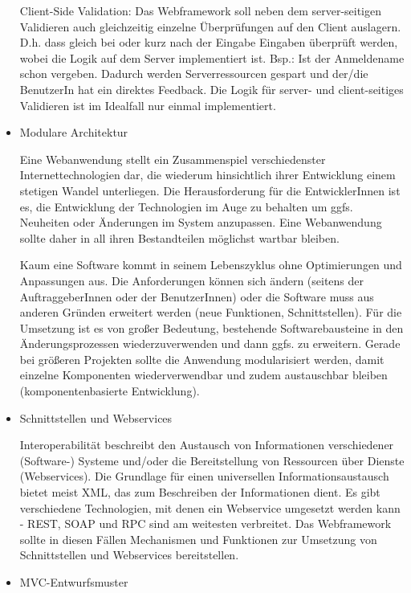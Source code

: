 \documentclass[abstracton, listof=totocnumbered,
bibliography=totocnumbered]{scrreprt}
\begin{document}
\begin{itemize}
Client-Side Validation: Das Webframework soll neben dem server-seitigen
Validieren auch gleichzeitig einzelne Überprüfungen auf den Client auslagern.
D.h. dass gleich bei oder kurz nach der Eingabe Eingaben überprüft werden,
wobei die Logik auf dem Server implementiert ist. Bsp.: Ist der Anmeldename
schon vergeben. Dadurch werden Serverressourcen gespart und der/die BenutzerIn
hat ein direktes Feedback. Die Logik für server- und client-seitiges Validieren
ist im Idealfall nur einmal implementiert.

  \item Modulare Architektur

Eine Webanwendung stellt ein Zusammenspiel verschiedenster Internettechnologien
dar, die wiederum hinsichtlich ihrer Entwicklung einem stetigen Wandel
unterliegen. Die Herausforderung für die EntwicklerInnen ist es, die
Entwicklung der Technologien im Auge zu behalten um ggfs. Neuheiten oder
Änderungen im System anzupassen. Eine Webanwendung sollte daher in all ihren
Bestandteilen möglichst wartbar bleiben.

Kaum eine Software kommt in seinem Lebenszyklus ohne Optimierungen und
Anpassungen aus. Die Anforderungen können sich ändern (seitens der
AuftraggeberInnen oder der BenutzerInnen) oder die Software muss aus anderen
Gründen erweitert werden (neue Funktionen, Schnittstellen). Für die Umsetzung
ist es von großer Bedeutung, bestehende Softwarebausteine in den
Änderungsprozessen wiederzuverwenden und dann ggfs. zu erweitern. Gerade bei
größeren Projekten sollte die Anwendung modularisiert werden, damit einzelne
Komponenten wiederverwendbar und zudem austauschbar bleiben
(komponentenbasierte Entwicklung).

  \item Schnittstellen und Webservices

Interoperabilität beschreibt den Austausch von Informationen verschiedener
(Software-) Systeme und/oder die Bereitstellung von Ressourcen über Dienste
(Webservices). Die Grundlage für einen universellen Informationsaustausch
bietet meist XML, das zum Beschreiben der Informationen dient. Es gibt
verschiedene Technologien, mit denen ein Webservice umgesetzt werden kann -
REST, SOAP und RPC sind am weitesten verbreitet. Das Webframework sollte in
diesen Fällen Mechanismen und Funktionen zur Umsetzung von Schnittstellen und
Webservices bereitstellen.

  \item MVC-Entwurfsmuster


\end{itemize}
\end{document}

